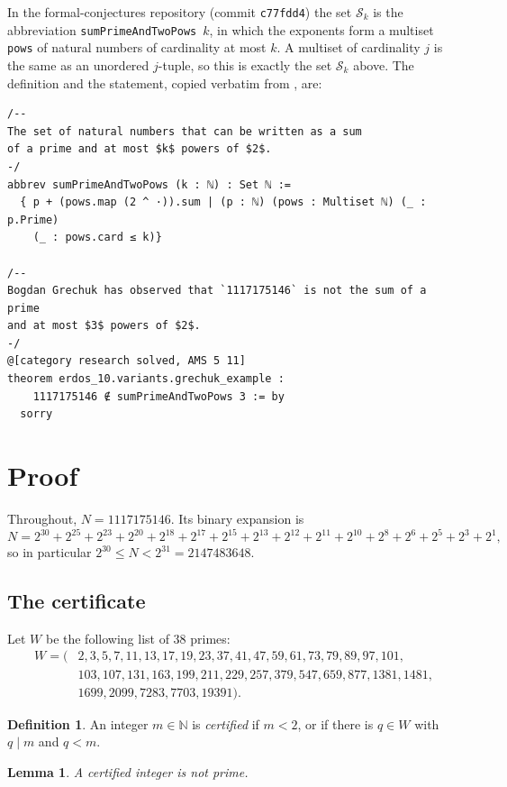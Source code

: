 \documentclass[11pt]{amsart}
\theoremstyle{plain}
\newtheorem{lemma}[theorem]{Lemma}
\theoremstyle{definition}
\newtheorem{definition}[theorem]{Definition}
\newcommand{\N}{\mathbb{N}}
\newcommand{\cS}{\mathcal{S}}
\begin{document}
In the formal-conjectures repository \cite{FC} (commit \texttt{c77fdd4}) the set $\cS_k$ is the abbreviation \texttt{sumPrimeAndTwoPows}~$k$, in which the exponents form a multiset \texttt{pows} of natural numbers of cardinality at most $k$. A multiset of cardinality $j$ is the same as an unordered $j$-tuple, so this is exactly the set $\cS_k$ above.
The definition and the statement, copied verbatim from , are:
\begin{lstlisting}
/--
The set of natural numbers that can be written as a sum
of a prime and at most $k$ powers of $2$.
-/
abbrev sumPrimeAndTwoPows (k : ℕ) : Set ℕ :=
  { p + (pows.map (2 ^ ·)).sum | (p : ℕ) (pows : Multiset ℕ) (_ : p.Prime)
    (_ : pows.card ≤ k)}

/--
Bogdan Grechuk has observed that `1117175146` is not the sum of a prime
and at most $3$ powers of $2$.
-/
@[category research solved, AMS 5 11]
theorem erdos_10.variants.grechuk_example :
    1117175146 ∉ sumPrimeAndTwoPows 3 := by
  sorry
\end{lstlisting}

\section{Proof}\label{sec:proof}

Throughout, $N=1117175146$. Its binary expansion is
\[
N=2^{30}+2^{25}+2^{23}+2^{20}+2^{18}+2^{17}+2^{15}+2^{13}+2^{12}+2^{11}+2^{10}+2^{8}+2^{6}+2^{5}+2^{3}+2^{1},
\]
so in particular $2^{30}\le N<2^{31}=2147483648$.

\subsection{The certificate}
Let $W$ be the following list of $38$ primes:
\[
\begin{aligned}
W=(&2, 3, 5, 7, 11, 13, 17, 19, 23, 37, 41, 47, 59, 61, 73, 79, 89, 97, 101,\\
   &103, 107, 131, 163, 199, 211, 229, 257, 379, 547, 659, 877, 1381, 1481,\\
   &1699, 2099, 7283, 7703, 19391).
\end{aligned}
\]

\begin{definition}\label{def:cert}
An integer $m\in\N$ is \emph{certified} if $m<2$, or if there is $q\in W$ with $q\mid m$ and $q<m$.
\end{definition}

\begin{lemma}\label{lem:sound}
A certified integer is not prime.
\end{lemma}
\end{document}
